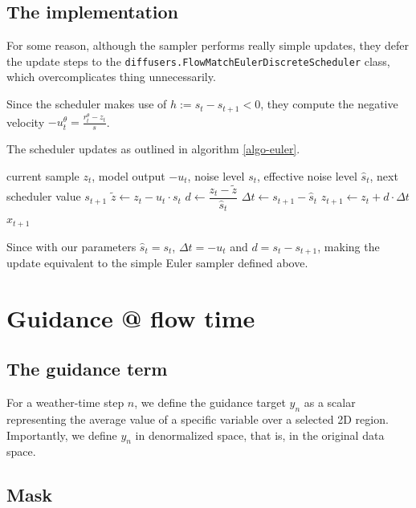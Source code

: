 \documentclass[a4paper,12pt]{article}
\begin{document}
\subsection{The implementation}
For some reason, although the sampler performs really simple updates, they defer the update steps to the \texttt{diffusers.FlowMatchEulerDiscreteScheduler} class, which overcomplicates thing unnecessarily.

Since the scheduler makes use of $h:=s_t-s_{t+1} < 0$, they compute the negative velocity $-u_t^\theta=\frac{r_{t}^\theta-z_{t}}{s}$.

The scheduler updates as outlined in algorithm \ref{algo-euler}.
\begin{algorithm}
\caption{Update}
\begin{algorithmic}[1]
\Require current sample $z_t$, model output $-u_t$, noise level $s_t$, effective noise level $\hat{s}_t$, next scheduler value $s_{t+1}$
\State $\tilde{z} \gets z_t - u_t \cdot s_t$
\State $d \gets \dfrac{z_t - \tilde{z}}{\hat{s}_t}$
\State $\Delta t \gets s_{t+1} - \hat{s}_t$
\State $z_{t+1} \gets z_t + d \cdot \Delta t$
\State \Return $x_{t+1}$
\end{algorithmic}
\label{algo-euler}
\end{algorithm}

Since with our parameters $\hat{s}_t=s_t$, $\Delta t=-u_t$ and $d=s_t-s_{t+1}$, making the update equivalent to the simple Euler sampler defined above. 


\clearpage
\section{Guidance @ flow time}

\subsection{The guidance term}

For a weather-time step $n$, we define the guidance target $y_n$ as a scalar representing the average value of a specific variable over a selected 2D region.
Importantly, we define $y_n$ in denormalized space, that is, in the original data space.

\subsection{Mask}
\end{document}
